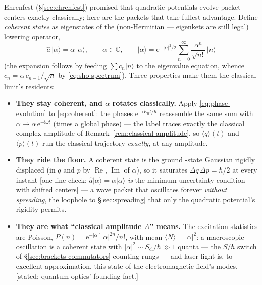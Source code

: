\documentclass[11pt]{article}
\theoremstyle{plain}
\theoremstyle{definition}
\theoremstyle{remark}
\newcommand{\ee}{\mathrm{e}}
\newcommand{\ii}{\mathrm{i}}
\newcommand{\C}{\mathbb{C}}
\newcommand{\op}[1]{\hat{#1}}
\newcommand{\ket}[1]{\lvert #1 \rangle}
\begin{document}
Ehrenfest (\S\ref{sec:ehrenfest}) promised that quadratic potentials
evolve packet centers exactly classically; here are the packets that
take fullest advantage. Define \emph{coherent states} as eigenstates
of the (non-Hermitian --- eigenkets are still legal) lowering
operator,
\begin{equation}
  \op a\,\ket\alpha = \alpha\,\ket\alpha,
  \qquad \alpha \in \C,
  \qquad
  \ket\alpha
  = \ee^{-|\alpha|^2/2}
    \sum_{n=0}^{\infty}
    \frac{\alpha^n}{\sqrt{n!}}\,\ket n
  \label{eq:coherent}
\end{equation}
(the expansion follows by feeding $\sum c_n\ket n$ to the
eigenvalue equation, whence
$c_{n} = \alpha\,c_{n-1}/\sqrt n$ by \eqref{eq:sho-spectrum}). Three properties make them the classical
limit's residents:
\begin{itemize}
  \item \textbf{They stay coherent, and $\alpha$ rotates
  classically.} Apply \eqref{eq:phase-evolution} to
  \eqref{eq:coherent}: the phases $\ee^{-\ii E_n t/\hbar}$
  reassemble the same sum with
  $\alpha \to \alpha\,\ee^{-\ii\omega t}$ (times a global phase) ---
  the label traces exactly the classical complex amplitude of
  Remark~\ref{rem:classical-amplitude}, so
  $\langle q\rangle(t)$ and $\langle p\rangle(t)$ run the classical
  trajectory \emph{exactly}, at any amplitude.
  \item \textbf{They ride the floor.} A coherent state is the ground
  -state Gaussian rigidly displaced (in $q$ and $p$ by
  $\operatorname{Re}$, $\operatorname{Im}$ of $\alpha$), so it
  saturates $\Delta q\,\Delta p = \hbar/2$ at every instant [one-line
  check: $\op a\ket\alpha = \alpha\ket\alpha$ \emph{is} the
  minimum-uncertainty condition with shifted centers] --- a
  wave packet that oscillates forever \emph{without spreading}, the
  loophole to \S\ref{sec:spreading} that only the quadratic
  potential's rigidity permits.
  \item \textbf{They are what ``classical amplitude $A$'' means.}
  The excitation statistics are Poisson,
  $P(n) = \ee^{-|\alpha|^2}|\alpha|^{2n}/n!$, with mean
  $\langle N\rangle = |\alpha|^2$: a macroscopic oscillation is a
  coherent state with $|\alpha|^2 \sim S_{\text{cl}}/\hbar \gg 1$
  quanta --- the $S/\hbar$ switch of
  \S\ref{sec:brackets-commutators} counting rungs --- and laser
  light is, to excellent approximation, this state of the
  electromagnetic field's modes. [stated; quantum optics'
  founding fact.]
\end{itemize}
\end{document}
